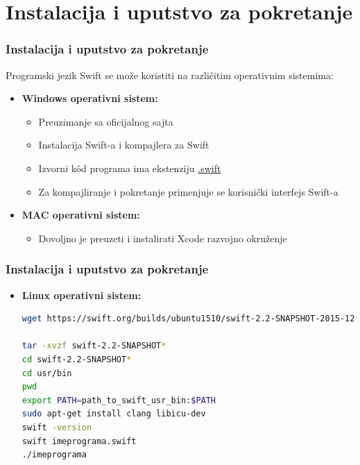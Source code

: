 \documentclass{beamer}
\begin{document}
\section{Instalacija i uputstvo za pokretanje}
\begin{frame}
\frametitle{Instalacija i uputstvo za pokretanje}

Programski jezik Swift se može koristiti na različitim operativnim sistemima:\\

\begin{itemize}

\item{\textbf{Windows operativni sistem:}}
\begin{itemize}
\item{Preuzimanje sa oficijalnog sajta}
\item{Instalacija Swift-a i kompajlera za Swift}
\item{Izvorni k\^{o}d programa ima ekstenziju \underline{.swift}}
\item{Za kompajliranje i pokretanje primenjuje se korisnički interfejs Swift-a}
\end{itemize}

\item{\textbf{MAC operativni sistem:}}
\begin{itemize}
\item{Dovoljno je preuzeti i instalirati Xcode razvojno okruženje}
\end{itemize}

\end{itemize}
\end{frame}


\begin{frame}[fragile]
\frametitle{Instalacija i uputstvo za pokretanje}

\begin{itemize}
\item \textbf{Linux operativni sistem:}
\begin{lstlisting}[language=bash, caption={Instaliranje Swift-a}]
wget https://swift.org/builds/ubuntu1510/swift-2.2-SNAPSHOT-2015-12-10-a/swift-2.2-SNAPSHOT-2015-12-10-a-ubuntu15.10.tar.gz
	
tar -xvzf swift-2.2-SNAPSHOT*
cd swift-2.2-SNAPSHOT*
cd usr/bin
pwd
export PATH=path_to_swift_usr_bin:$PATH
sudo apt-get install clang libicu-dev
swift -version
swift imeprograma.swift
./imeprograma
\end{lstlisting}
\end{itemize}

\end{frame}
\end{document}
